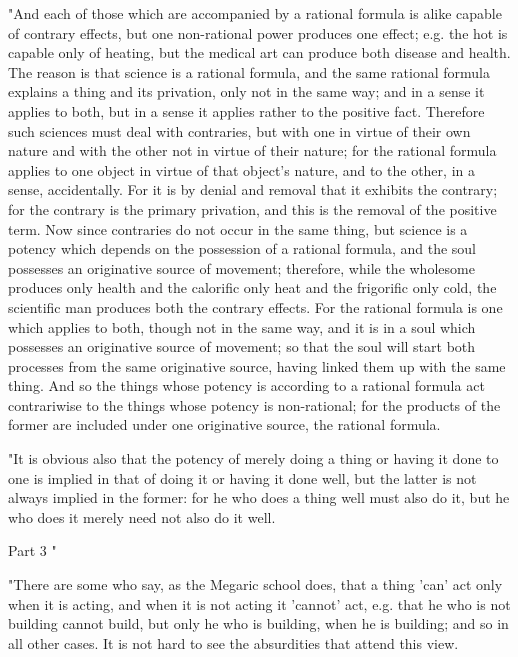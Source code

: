 "And each of those which are accompanied by a rational formula is
alike capable of contrary effects, but one non-rational power produces
one effect; e.g. the hot is capable only of heating, but the medical
art can produce both disease and health. The reason is that science
is a rational formula, and the same rational formula explains a thing
and its privation, only not in the same way; and in a sense it applies
to both, but in a sense it applies rather to the positive fact. Therefore
such sciences must deal with contraries, but with one in virtue of
their own nature and with the other not in virtue of their nature;
for the rational formula applies to one object in virtue of that object's
nature, and to the other, in a sense, accidentally. For it is by denial
and removal that it exhibits the contrary; for the contrary is the
primary privation, and this is the removal of the positive term. Now
since contraries do not occur in the same thing, but science is a
potency which depends on the possession of a rational formula, and
the soul possesses an originative source of movement; therefore, while
the wholesome produces only health and the calorific only heat and
the frigorific only cold, the scientific man produces both the contrary
effects. For the rational formula is one which applies to both, though
not in the same way, and it is in a soul which possesses an originative
source of movement; so that the soul will start both processes from
the same originative source, having linked them up with the same thing.
And so the things whose potency is according to a rational formula
act contrariwise to the things whose potency is non-rational; for
the products of the former are included under one originative source,
the rational formula. 

"It is obvious also that the potency of merely doing a thing or having
it done to one is implied in that of doing it or having it done well,
but the latter is not always implied in the former: for he who does
a thing well must also do it, but he who does it merely need not also
do it well. 

Part 3 "

"There are some who say, as the Megaric school does, that a thing
'can' act only when it is acting, and when it is not acting it 'cannot'
act, e.g. that he who is not building cannot build, but only he who
is building, when he is building; and so in all other cases. It is
not hard to see the absurdities that attend this view. 

